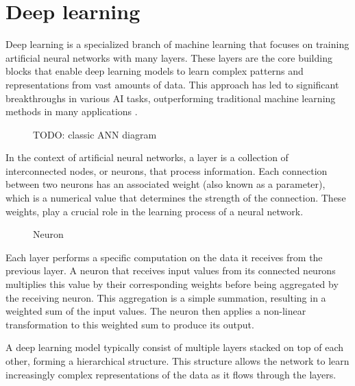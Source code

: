 \section{Deep learning}
Deep learning is a specialized branch of machine learning that focuses on training artificial neural networks with many layers.
These layers are the core building blocks that enable deep learning models to learn complex patterns and representations from vast amounts of data.
This approach has led to significant breakthroughs in various AI tasks, outperforming traditional machine learning methods in many applications \cite{lecunDeepLearning2015}.

\begin{figure}[hbtp]
    \centering    
    
    \caption{TODO: classic ANN diagram}
    \label{fig:ann}
\end{figure}

In the context of artificial neural networks, a layer is a collection of interconnected nodes, or neurons, that process information.
Each connection between two neurons has an associated weight (also known as a parameter), which is a numerical value that determines the strength of the connection.
These weights, play a crucial role in the learning process of a neural network.

\begin{figure}[hbtp]
    \centering    
    
    \caption{Neuron} %
    \label{TODO}
\end{figure}

Each layer performs a specific computation on the data it receives from the previous layer.
A neuron that receives input values from its connected neurons multiplies this value by their corresponding weights before being aggregated by the receiving neuron.
This aggregation is a simple summation, resulting in a weighted sum of the input values.
The neuron then applies a non-linear transformation to this weighted sum to produce its output.

A deep learning model typically consist of multiple layers stacked on top of each other, forming a hierarchical structure.
This structure allows the network to learn increasingly complex representations of the data as it flows through the layers.

